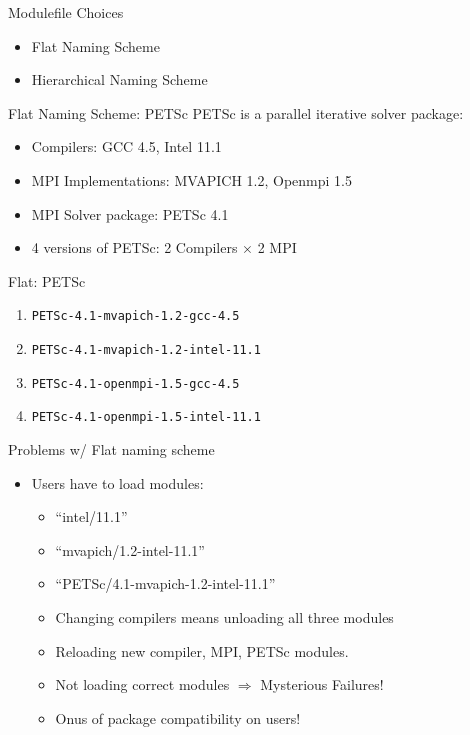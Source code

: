 \documentclass{beamer}
\begin{document}
\begin{frame}{Modulefile Choices}
  \begin{itemize}
    \item Flat Naming Scheme
    \item Hierarchical Naming Scheme
  \end{itemize}
\end{frame}

\begin{frame}{Flat Naming Scheme: PETSc}
  PETSc is a parallel iterative solver package:
  \begin{itemize}
    \item Compilers: GCC 4.5, Intel 11.1
    \item MPI Implementations: MVAPICH 1.2, Openmpi 1.5
    \item MPI Solver package: PETSc 4.1
    \item 4 versions of PETSc: 2 Compilers $\times$ 2 MPI
  \end{itemize}
\end{frame}

\begin{frame}{Flat: PETSc }
  \begin{enumerate}
  \item \texttt{PETSc-4.1-mvapich-1.2-gcc-4.5}
  \item \texttt{PETSc-4.1-mvapich-1.2-intel-11.1}
  \item \texttt{PETSc-4.1-openmpi-1.5-gcc-4.5}
  \item \texttt{PETSc-4.1-openmpi-1.5-intel-11.1}
  \end{enumerate}
\end{frame}

\begin{frame}{Problems w/ Flat naming scheme}
  \begin{itemize}
    \item Users have to load modules:
      \begin{itemize}
        \item ``intel/11.1''
        \item ``mvapich/1.2-intel-11.1''
        \item ``PETSc/4.1-mvapich-1.2-intel-11.1''
        \item Changing compilers means unloading all three modules
        \item Reloading new compiler, MPI, PETSc modules.
        \item Not loading correct modules $\Rightarrow$ Mysterious Failures!
        \item Onus of package compatibility on users!
      \end{itemize}
  \end{itemize}
\end{frame}
\end{document}
